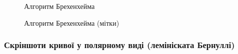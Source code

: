 \documentclass[a4paper,14pt]{extarticle} %
\begin{document}
\begin{figure}[h]
    \begin{minipage}[h]{0.49\linewidth}
        \caption{Алгоритм Брехенхейма}
    \end{minipage}
    \hfill
    \begin{minipage}[h]{0.49\linewidth}
        \caption{Алгоритм Брехенхейма (мітки)}
    \end{minipage}
\end{figure}

\subsubsection*{Скріншоти кривої у полярному виді (лемініската Бернуллі)}
\end{document}
